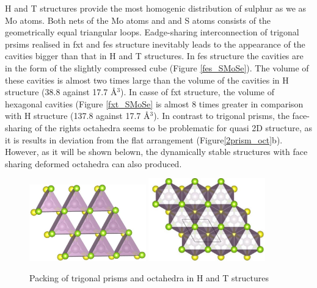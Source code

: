 \documentclass[a4paperm]{article}
\begin{document}
H and T structures provide the most homogenic distribution of sulphur as we as Mo atoms. 
Both nets of the Mo atoms and and S atoms consists of the geometrically equal triangular loops.
Eadge-sharing interconnection of trigonal prsims realised in fxt and fes structure inevitably leads to the appearance of the cavities bigger than that in H and T structures. 
In fes structure the cavities are in the form of the slightly compressed cube (Figure \ref{fes_SMoSe}).
The volume of these cavities is almost two times large than the volume of the cavities in H structure (38.8 against 17.7 \AA$^3$).
In casse of fxt structure, the volume of hexagonal cavities (Figure \ref{fxt_SMoSe} is almost 8 times greater in comparison with H structure (137.8 against 17.7 \AA$^3$).
In contrast to trigonal prisms, the face-sharing of the rights octahedra seems to be problematic for quasi 2D structure, as it is results in deviation from the flat arrangement (Figure\ref{2prism_oct}b).
However, as it will be shown belown, the dynamically stable structures with face sharing deformed octahedra can also produced. 


\begin{figure}[H]
        \includegraphics[width=0.45\textwidth]{1H.jpg}
        \includegraphics[width=0.45\textwidth]{1T.jpg}
        \caption{Packing of trigonal prisms and octahedra in H and T structures}
\label{1H1T}
\label{fes_fxt}
\end{figure}
\end{document}
